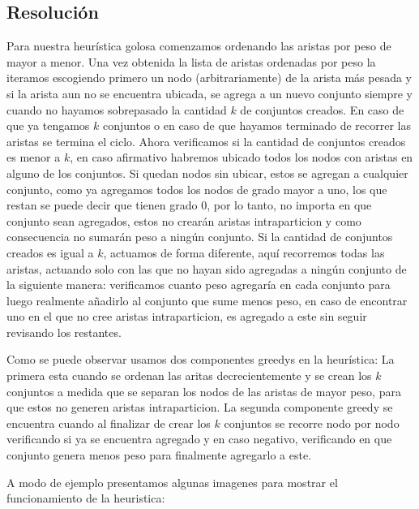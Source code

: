 \subsection{Resoluci\'on}

Para nuestra heurística golosa comenzamos ordenando las aristas por peso de mayor a menor. Una vez obtenida la lista de aristas ordenadas por peso la iteramos escogiendo primero un nodo (arbitrariamente) de la arista más pesada y si la arista aun no se encuentra ubicada, se agrega a un nuevo conjunto siempre y cuando no hayamos sobrepasado la cantidad $k$ de conjuntos creados. En caso de que ya tengamos $k$ conjuntos o en caso de que hayamos terminado de recorrer las aristas se termina el ciclo.
Ahora verificamos si la cantidad de conjuntos creados es menor a $k$, en caso afirmativo habremos ubicado todos los nodos con aristas en alguno de los conjuntos.
Si quedan nodos sin ubicar, estos se agregan a cualquier conjunto, como ya agregamos todos los nodos de grado mayor a uno, los que restan se puede decir que tienen grado 0, por lo tanto, no importa en que conjunto sean agregados, estos no crearán aristas intraparticion y como consecuencia no sumarán peso a ningún conjunto.
Si la cantidad de conjuntos creados es igual a $k$, actuamos de forma diferente, aquí recorremos todas las aristas, actuando solo con las que no hayan sido agregadas a ningún conjunto de la siguiente manera: verificamos cuanto peso agregaría en cada conjunto para luego realmente añadirlo al conjunto que sume menos peso, en caso de encontrar uno en el que no cree aristas intraparticion, es agregado a este sin seguir revisando los restantes.

Como se puede observar usamos dos componentes greedys en la heurística:
La primera esta cuando se ordenan las aritas decrecientemente y se crean los $k$ conjuntos a medida que se separan los nodos de las aristas de mayor peso, para que estos no generen aristas intraparticion.
La segunda componente greedy se encuentra cuando al finalizar de crear los $k$ conjuntos se recorre nodo por nodo verificando si ya se encuentra agregado y en caso negativo, verificando en que conjunto genera menos peso para finalmente agregarlo a este.

A modo de ejemplo presentamos algunas imagenes para mostrar el funcionamiento de la heuristica:

